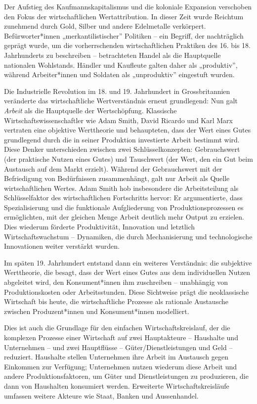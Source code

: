 \documentclass[
  nswissgerman,
  a4paper,
  openany]{book}
\begin{document}
Der Aufstieg des Kaufmannskapitalismus und die koloniale Expansion
verschoben den Fokus der wirtschaftlichen Wertattribution. In dieser
Zeit wurde Reichtum zunehmend durch Gold, Silber und andere Edelmetalle
verkörpert. Befürworter*innen „merkantilistischer'' Politiken -- ein
Begriff, der nachträglich geprägt wurde, um die vorherrschenden
wirtschaftlichen Praktiken des 16. bis 18. Jahrhunderts zu beschreiben
-- betrachteten Handel als die Hauptquelle nationalen Wohlstands.
Händler und Kaufleute galten daher als „produktiv'', während
Arbeiter*innen und Soldaten als „unproduktiv'' eingestuft wurden.

Die Industrielle Revolution im 18. und 19. Jahrhundert in
Grossbritannien veränderte das wirtschaftliche Wertverständnis erneut
grundlegend: Nun galt \emph{Arbeit} als die Hauptquelle der
Wertschöpfung. Klassische Wirtschaftswissenschaftler wie Adam Smith,
David Ricardo und Karl Marx vertraten eine objektive Werttheorie und
behaupteten, dass der Wert eines Gutes grundlegend durch die in seiner
Produktion investierte Arbeit bestimmt wird. Diese Denker unterschieden
zwischen zwei Schlüsselkonzepten: Gebrauchswert (der praktische Nutzen
eines Gutes) und Tauschwert (der Wert, den ein Gut beim Austausch auf
dem Markt erzielt). Während der Gebrauchswert mit der Befriedigung von
Bedürfnissen zusammenhängt, galt nur Arbeit als Quelle wirtschaftlichen
Wertes. Adam Smith hob insbesondere die Arbeitsteilung als
Schlüsselfaktor des wirtschaftlichen Fortschritts hervor: Er
argumentierte, dass Spezialisierung und die funktionale Aufgliederung
von Produktionsprozessen es ermöglichten, mit der gleichen Menge Arbeit
deutlich mehr Output zu erzielen. Dies wiederum förderte Produktivität,
Innovation und letztlich Wirtschaftswachstum -- Dynamiken, die durch
Mechanisierung und technologische Innovationen weiter verstärkt wurden.

Im späten 19. Jahrhundert entstand dann ein weiteres Verständnis: die
subjektive Werttheorie, die besagt, dass der Wert eines Gutes aus dem
individuellen Nutzen abgeleitet wird, den Konsument*innen ihm
zuschreiben -- unabhängig von Produktionskosten oder Arbeitsstunden.
Diese Sichtweise prägt die neoklassische Wirtschaft bis heute, die
wirtschaftliche Prozesse als rationale Austausche zwischen
Produzent*innen und Konsument*innen modelliert.

Dies ist auch die Grundlage für den einfachen Wirtschaftskreislauf, der
die komplexen Prozesse einer Wirtschaft auf zwei Hauptakteure --
Haushalte und Unternehmen -- und zwei Hauptflüsse --
Güter/Dienstleistungen und Geld -- reduziert. Haushalte stellen
Unternehmen ihre Arbeit im Austausch gegen Einkommen zur Verfügung;
Unternehmen nutzen wiederum diese Arbeit und andere Produktionsfaktoren,
um Güter und Dienstleistungen zu produzieren, die dann von Haushalten
konsumiert werden. Erweiterte Wirtschaftskreisläufe umfassen weitere
Akteure wie Staat, Banken und Aussenhandel.
\end{document}

